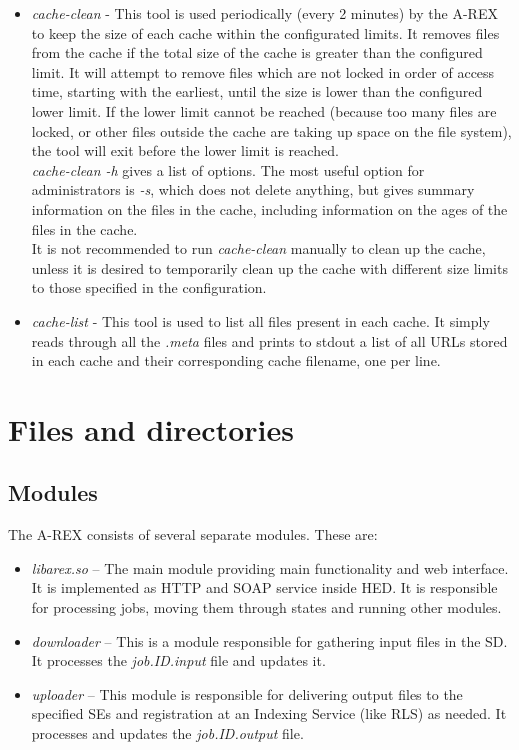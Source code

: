 \documentclass{article}                            %
\begin{document}
\begin{itemize}
\item \emph{cache-clean} - This tool is used periodically (every 2 minutes)
by the A-REX to keep the size of each cache within the configurated limits.
It removes files from the cache if the total size of the cache is
greater than the configured limit. It will attempt to remove files
which are not locked in order of access time, starting with the earliest,
until the size is lower than the configured lower limit. If the lower
limit cannot be reached (because too many files are locked, or other
files outside the cache are taking up space on the file system), the
tool will exit before the lower limit is reached.\\
\emph{cache-clean -h} gives a list of options. The most useful option
for administrators is \emph{-s}, which does not delete anything, but
gives summary information on the files in the cache, including information
on the ages of the files in the cache.\\
It is not recommended to run \emph{cache-clean }manually to clean
up the cache, unless it is desired to temporarily clean up the cache
with different size limits to those specified in the configuration.
\item \emph{cache-list} - This tool is used to list all files present in
each cache. It simply reads through all the \emph{.meta }files and
prints to stdout a list of all URLs stored in each cache and their
corresponding cache filename, one per line.
\end{itemize}

\section{Files and directories\label{sec:files and directories}}

\subsection{Modules}

The A-REX consists of several separate modules. These are:

\begin{itemize}
\item \textit{libarex.so} -- The main module providing main functionality
and web interface. It is implemented as HTTP and SOAP service inside
HED. It is responsible for processing jobs, moving them through states
and running other modules.
\item \textit{downloader} -- This is a module responsible for gathering input
files in the SD. It processes the \textit{job.ID.input} file and updates
it.
\item \textit{uploader} -- This module is responsible for delivering output
files to the specified SEs and registration at an Indexing Service
(like RLS) as needed. It processes and updates the \textit{job.ID.output}
file.
\end{itemize}
\end{document}

